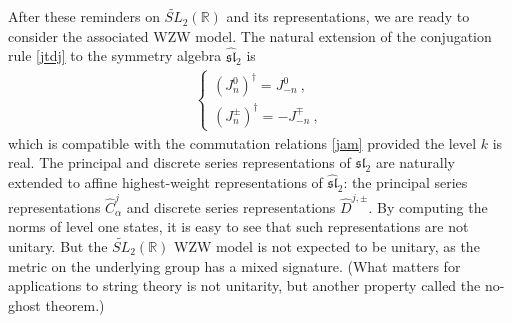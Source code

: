 \documentclass[12pt, a4paper, notitlepage, twoside]{report}
\numberwithin{equation}{section}
\theoremstyle{break}
\begin{document}
After these reminders on $\widetilde{SL}_2(\mathbb{R})$ and its representations, we are ready to consider the associated WZW model. 
The natural extension of the conjugation rule \eqref{jtdj} to the symmetry algebra $\widehat{\mathfrak{sl}}_2$ is
\begin{align}
 \left\{\begin{array}{l} (J_n^0)^\dagger = J_{-n}^0\ , \\
         (J_n^\pm)^\dagger = -J_{-n}^\mp \ ,
        \end{array}
\right.
\end{align}
which is compatible with the commutation relations \eqref{jam} provided the level $k$ is real.
The principal and discrete series representations of $\mathfrak{sl}_2$ are naturally extended to affine highest-weight representations of $\widehat{\mathfrak{sl}}_2$: the principal series representations $\hat{C}^j_\alpha$ and discrete series representations $\hat{D}^{j,\pm}$.
By computing the norms of level one states, it is easy to see that such representations are not unitary.
But the $\widetilde{SL}_2(\mathbb{R})$ WZW model is not expected to be unitary, as the metric on the underlying group has a mixed signature. (What matters for applications to string theory is not unitarity, but another property called the no-ghost theorem.) 
\end{document}
